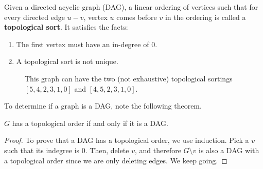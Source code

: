   \begin{definition}
    Given a directed acyclic graph (DAG), a linear ordering of vertices such that for every directed edge $u-v$, vertex $u$ comes before $v$ in the ordering is called a \textbf{topological sort}. It satisfies the facts: 
    \begin{enumerate}
      \item The first vertex must have an in-degree of $0$. 
      \item A topological sort is not unique. 
    \end{enumerate}

    \begin{figure}[H]
      \centering 
      \caption{This graph can have the two (not exhaustive) topological sortings $[5, 4, 2, 3, 1, 0]$ and $[4, 5, 2, 3, 1, 0]$.}
      \label{fig:top_sort_not_unique}
    \end{figure}
  \end{definition}

  To determine if a graph is a DAG, note the following theorem. 

  \begin{theorem}
    $G$ has a topological order if and only if it is a DAG. 
  \end{theorem}
  \begin{proof}
    To prove that a DAG has a topological order, we use induction. Pick a $v$ such that its indegree is $0$. Then, delete $v$, and therefore $G \setminus v$ is also a DAG with a topological order since we are only deleting edges. We keep going. 
  \end{proof}

